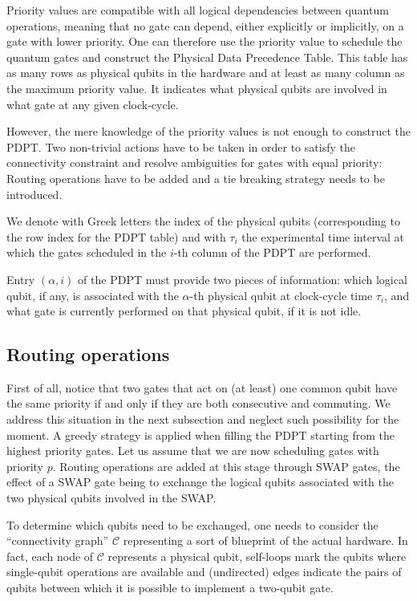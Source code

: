 \documentclass[%
onecolumn,pra,
superscriptaddress,
nofootinbib,
 amsmath,amssymb,
 aps,
11pt,
]{revtex4-1}
\begin{document}
Priority values are compatible with all logical dependencies between quantum operations, meaning that no gate can depend, either explicitly or implicitly, on a gate with lower priority. One can therefore use the priority value to schedule the quantum gates and construct the Physical Data Precedence Table. This table has as many rows as physical qubits in the hardware and at least as many column as the maximum priority value. It indicates what physical qubits are involved in what gate at any given clock-cycle.

However, the mere knowledge of the priority values is not enough to construct the PDPT. Two non-trivial actions have to be taken in order to satisfy the connectivity constraint and resolve ambiguities for gates with equal priority: Routing operations have to be added and a tie breaking strategy needs to be introduced.

We denote with Greek letters the index of the physical qubits (corresponding to the row index for the PDPT table) and with $\tau_i$ the experimental time interval at which the gates scheduled in the $i$-th column of the PDPT are performed.

Entry $(\alpha,i)$ of the PDPT must provide two pieces of information: which logical qubit, if any, is associated with the $\alpha$-th physical qubit at clock-cycle time $\tau_i$, and what gate is currently performed on that physical qubit, if it is not idle.

\subsection{Routing operations}
\label{sec:PDPT_routing}

First of all, notice that two gates that act on (at least) one common qubit have the same priority if and only if they are both consecutive and commuting. We address this situation in the next subsection and neglect such possibility for the moment. A greedy strategy is applied when filling the PDPT starting from the highest priority gates. Let us assume that we are now scheduling gates with priority $p$. Routing operations are added at this stage through SWAP gates, the effect of a SWAP gate being to exchange the logical qubits associated with the two physical qubits involved in the SWAP.

To determine which qubits need to be exchanged, one needs to consider the ``connectivity graph'' $\mathcal{C}$ representing a sort of blueprint of the actual hardware. In fact, each node of $\mathcal{C}$ represents a physical qubit, self-loops mark the qubits where single-qubit operations are available and (undirected) edges indicate the pairs of qubits between which it is possible to implement a two-qubit gate.
\end{document}

